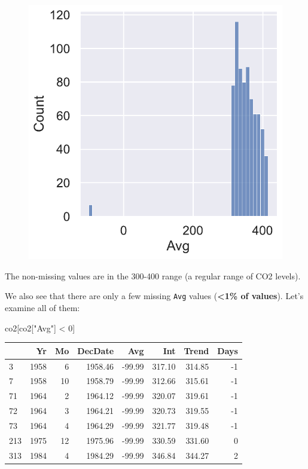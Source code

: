 \documentclass[
  letterpaper,
  DIV=11,
  numbers=noendperiod]{scrreprt}
\newenvironment{Shaded}{\begin{snugshade}}{\end{snugshade}}
\newcommand{\DecValTok}[1]{\textcolor[rgb]{0.68,0.00,0.00}{#1}}
\newcommand{\NormalTok}[1]{\textcolor[rgb]{0.00,0.23,0.31}{#1}}
\newcommand{\OperatorTok}[1]{\textcolor[rgb]{0.37,0.37,0.37}{#1}}
\newcommand{\StringTok}[1]{\textcolor[rgb]{0.13,0.47,0.30}{#1}}
\begin{document}
\begin{figure}[H]

{\centering \includegraphics{eda/eda_files/figure-pdf/cell-69-output-2.pdf}

}

\end{figure}

The non-missing values are in the 300-400 range (a regular range of CO2
levels).

We also see that there are only a few missing \texttt{Avg} values
(\textbf{\textless1\% of values}). Let's examine all of them:

\begin{Shaded}
\begin{Highlighting}[]
\NormalTok{co2[co2[}\StringTok{"Avg"}\NormalTok{] }\OperatorTok{\textless{}} \DecValTok{0}\NormalTok{]}
\end{Highlighting}
\end{Shaded}

\begin{tabular}{lrrrrrrr}
\toprule
{} &    Yr &  Mo &  DecDate &    Avg &    Int &  Trend &  Days \\
\midrule
3   &  1958 &   6 &  1958.46 & -99.99 & 317.10 & 314.85 &    -1 \\
7   &  1958 &  10 &  1958.79 & -99.99 & 312.66 & 315.61 &    -1 \\
71  &  1964 &   2 &  1964.12 & -99.99 & 320.07 & 319.61 &    -1 \\
72  &  1964 &   3 &  1964.21 & -99.99 & 320.73 & 319.55 &    -1 \\
73  &  1964 &   4 &  1964.29 & -99.99 & 321.77 & 319.48 &    -1 \\
213 &  1975 &  12 &  1975.96 & -99.99 & 330.59 & 331.60 &     0 \\
313 &  1984 &   4 &  1984.29 & -99.99 & 346.84 & 344.27 &     2 \\
\bottomrule
\end{tabular}
\end{document}
